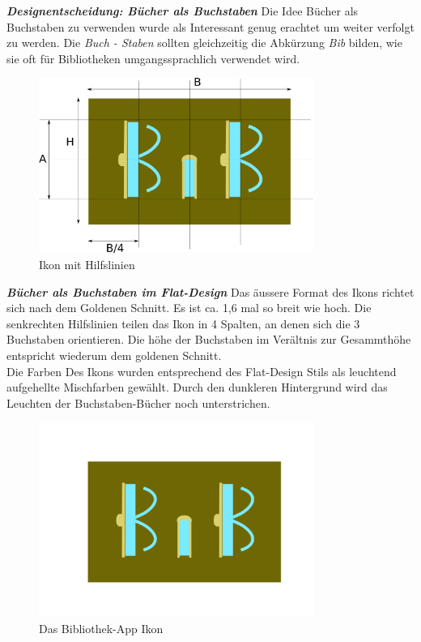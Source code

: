 \documentclass[a4paper,10pt]{article}
\begin{document}
\textbf{\textit{Designentscheidung: Bücher als Buchstaben}} \newline
Die Idee Bücher als Buchstaben zu verwenden wurde als Interessant genug erachtet um weiter verfolgt zu werden. Die \textit{Buch - Staben} sollten gleichzeitig die Abkürzung \textit{Bib} bilden, wie sie oft für Bibliotheken umgangssprachlich verwendet wird. 
\begin{figure}[ht]
\centering \includegraphics[width=0.8\textwidth]{bib_konst}
\caption{Ikon mit Hilfslinien}
\end{figure}
\newpage
\textbf{\textit{Bücher als Buchstaben im Flat-Design}} \newline
Das äussere Format des Ikons richtet sich nach dem Goldenen Schnitt. Es ist ca. 1,6 mal so breit wie hoch. Die senkrechten Hilfslinien teilen das Ikon in 4 Spalten, an denen sich die 3 Buchstaben orientieren. Die höhe der Buchstaben im Verältnis zur Gesammthöhe entspricht wiederum dem goldenen Schnitt.\\
Die Farben Des Ikons wurden entsprechend des Flat-Design Stils als leuchtend aufgehellte Mischfarben gewählt. Durch den dunkleren Hintergrund wird das Leuchten der Buchstaben-Bücher noch unterstrichen.
\begin{figure}[ht]
\centering \includegraphics[width=0.8\textwidth]{bib5}
\caption{Das Bibliothek-App Ikon}
\end{figure}
\end{document}
